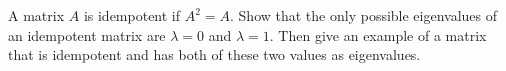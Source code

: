 A matrix $A$ is idempotent if $A^2=A$.  Show that the only possible eigenvalues of an idempotent matrix are $\lambda=0$ and $\lambda=1$.  Then give an example of a matrix that is idempotent and has both of these two values as eigenvalues. 